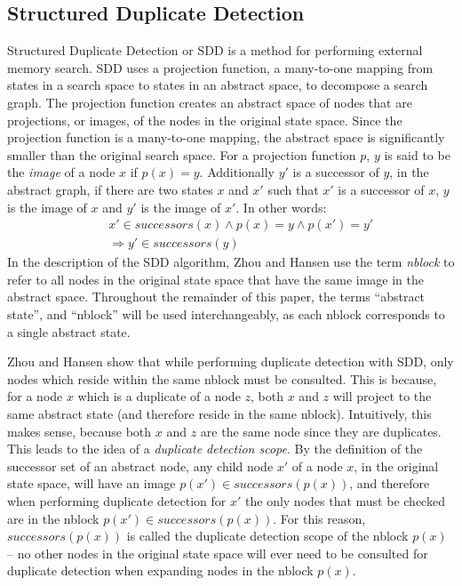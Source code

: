 \documentclass{article}
\begin{document}
 \subsection{Structured Duplicate Detection}

 Structured Duplicate Detection or SDD \cite{zhou:sdd} is a method for
 performing external memory search.  SDD uses a projection function, a
 many-to-one mapping from states in a search space to states in an
 abstract space, to decompose a search graph.  The projection function
 creates an abstract space of nodes that are projections, or images, of
 the nodes in the original state space.  Since the projection function
 is a many-to-one mapping, the abstract space is significantly smaller
 than the original search space.  For a projection function $p$, $y$ is
 said to be the \emph{image} of a node $x$ if $p(x) = y$.  Additionally
 $y'$ is a successor of $y$, in the abstract graph, if there are two
 states $x$ and $x'$ such that $x'$ is a successor of $x$, $y$ is the
 image of $x$ and $y'$ is the image of $x'$.  In other words:
 \begin{eqnarray*}
   &&x' \in successors(x) \wedge p(x) = y \wedge p(x') = y'\\
   &&\Rightarrow y' \in successors(y)
 \end{eqnarray*}
 In the description of the SDD algorithm, Zhou and Hansen use the term
 \emph{nblock} to refer to all nodes in the original state space that
 have the same image in the abstract space.  Throughout the remainder
 of this paper, the terms ``abstract state'', and ``nblock'' will be
 used interchangeably, as each nblock corresponds to a single abstract
 state.

 Zhou and Hansen show that while performing duplicate detection with
 SDD, only nodes which reside within the same nblock must be consulted.
 This is because, for a node $x$ which is a duplicate of a node $z$,
 both $x$ and $z$ will project to the same abstract state (and
 therefore reside in the same nblock).  Intuitively, this makes sense,
 because both $x$ and $z$ are the same node since they are duplicates.
 This leads to the idea of a \emph{duplicate detection scope}.  By the
 definition of the successor set of an abstract node, any child node
 $x'$ of a node $x$, in the original state space, will have an image
 $p(x') \in successors(p(x))$, and therefore when performing duplicate
 detection for $x'$ the only nodes that must be checked are in the
 nblock $p(x') \in successors(p(x))$.  For this reason,
 $successors(p(x))$ is called the duplicate detection scope of the
 nblock $p(x)$ -- no other nodes in the original state space will ever
 need to be consulted for duplicate detection when expanding nodes in
 the nblock $p(x)$.
\end{document}
